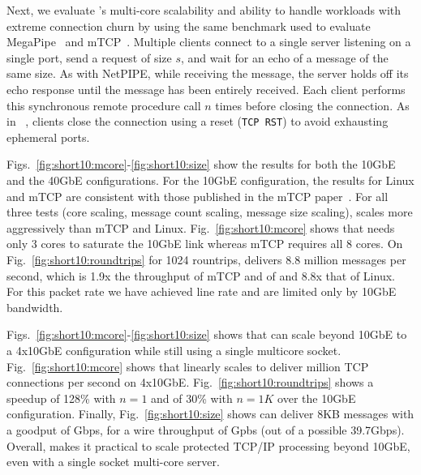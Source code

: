 Next, we evaluate \ix's multi-core scalability and ability to handle workloads
with extreme connection churn by using the same benchmark used to
evaluate MegaPipe~\cite{DBLP:conf/osdi/HanMCR12} and
mTCP~\cite{jeong2014mtcp}. Multiple clients connect to a single server
listening on a single port, send a request of size $s$, and wait for an
echo of a message of the same size.  As with NetPIPE, while receiving
the message, the server holds off its echo response until the message
has been entirely received.  Each client performs this synchronous
remote procedure call $n$ times before closing the connection.
As in ~\cite{jeong2014mtcp}, clients close the connection using a
reset (\texttt{TCP RST}) to avoid exhausting ephemeral ports.
 



Figs.~\ref{fig:short10:mcore}-\ref{fig:short10:size} show the results
for both the 10GbE and the 40GbE configurations.  For the 10GbE
configuration, the results for Linux and mTCP are consistent with those
published in the mTCP paper~\cite{jeong2014mtcp}.  For all three
tests (core scaling, message count scaling, message size scaling), \ix
scales more aggressively than mTCP and
Linux. Fig.~\ref{fig:short10:mcore} shows that \ix needs only 3 cores
to saturate the 10GbE link whereas mTCP requires all 8 cores. On
Fig.~\ref{fig:short10:roundtrips} for 1024 rountrips, \ix delivers 8.8
million messages per second, which is 1.9x the throughput of mTCP and
of and  8.8x that of Linux. For this packet rate we
have achieved line rate and are limited only by 10GbE bandwidth.


Figs.~\ref{fig:short10:mcore}-\ref{fig:short10:size} shows that
\ix can scale beyond 10GbE to a 4x10GbE configuration while still using a single multicore socket.
Fig.~\ref{fig:short10:mcore} shows that \ix linearly scales to deliver
million TCP connections per second on 4x10GbE.
Fig.~\ref{fig:short10:roundtrips} shows a speedup of 128\% with $n=1$
and of 30\% with $n=1K$ over the 10GbE configuration.  Finally,
Fig.~\ref{fig:short10:size} shows \ix can deliver 8KB messages with a
goodput of Gbps, for a wire throughput of Gpbs (out of
a possible 39.7Gbps).  Overall, \ix makes it practical to scale
protected TCP/IP processing beyond 10GbE, even with a single socket
multi-core server.


